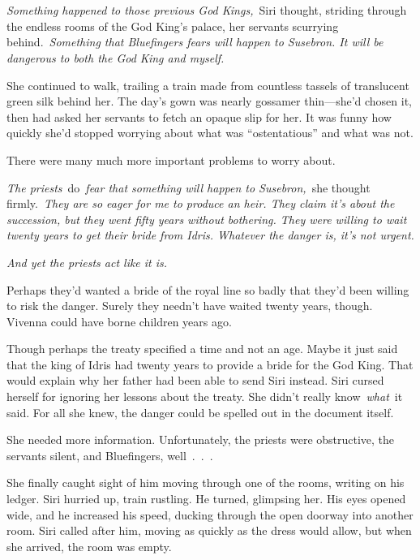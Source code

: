 \chapter{}

\textit{Something happened to those previous God Kings,}~Siri thought, striding through the endless rooms of the God King’s palace, her servants scurrying behind.~\textit{Something that Bluefingers fears will happen to Susebron. It will be dangerous to both the God King and myself.}

She continued to walk, trailing a train made from countless tassels of translucent green silk behind her. The day’s gown was nearly gossamer thin—she’d chosen it, then had asked her servants to fetch an opaque slip for her. It was funny how quickly she’d stopped worrying about what was “ostentatious” and what was not.

There were many much more important problems to worry about.

\textit{The priests}~do~\textit{fear that something will happen to Susebron,}~she thought firmly.~\textit{They are so eager for me to produce an heir. They claim it’s about the succession, but they went fifty years without bothering. They were willing to wait twenty years to get their bride from Idris. Whatever the danger is, it’s not urgent.}

\textit{And yet the priests act like it is.}

Perhaps they’d wanted a bride of the royal line so badly that they’d been willing to risk the danger. Surely they needn’t have waited twenty years, though. Vivenna could have borne children years ago.

Though perhaps the treaty specified a time and not an age. Maybe it just said that the king of Idris had twenty years to provide a bride for the God King. That would explain why her father had been able to send Siri instead. Siri cursed herself for ignoring her lessons about the treaty. She didn’t really know~\textit{what}~it said. For all she knew, the danger could be spelled out in the document itself.

She needed more information. Unfortunately, the priests were obstructive, the servants silent, and Bluefingers, well~.~.~.

She finally caught sight of him moving through one of the rooms, writing on his ledger. Siri hurried up, train rustling. He turned, glimpsing her. His eyes opened wide, and he increased his speed, ducking through the open doorway into another room. Siri called after him, moving as quickly as the dress would allow, but when she arrived, the room was empty.

